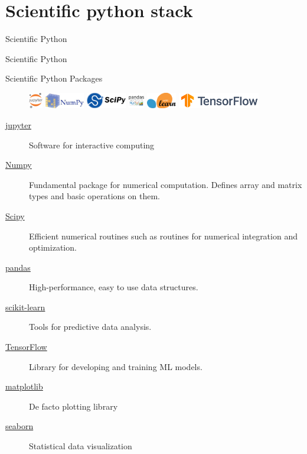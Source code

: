 \documentclass[aspectratio=169]{beamer}
\begin{document}
\section{Scientific python stack}

\begin{frame}{Scientific Python}
    \Huge{\centerline{Scientific Python}}
\end{frame} 

\begin{frame}{Scientific Python Packages}
\begin{figure}
    \centering
    \includegraphics[height=0.7cm]{figures/jupyter-logo.png}
    \includegraphics[height=0.7cm]{figures/numpy-logo.jpeg}
    \includegraphics[height=0.7cm]{figures/scipy-logo.png}
    \includegraphics[height=0.7cm]{figures/pandas-logo.png}
    \includegraphics[height=0.7cm]{figures/scikit-learn-logo.png}
    \includegraphics[height=0.7cm]{figures/tensorflow-logo.png}
\end{figure}
    \begin{description}
        \item[\href{http://jupyter.org/}{jupyter}] Software for interactive computing
        \item[\href{http://www.scipy.org/}{Numpy}] Fundamental package for numerical computation. Defines array and matrix types and basic operations on them.
        \item[\href{http://www.scipy.org/}{Scipy}] Efficient numerical routines such as routines for numerical integration and optimization.
        \item[\href{http://pandas.pydata.org/}{pandas}] High-performance, easy to use data structures.
        \item[\href{http://scikit-learn.org/}{scikit-learn}] Tools for predictive data analysis.
        \item[\href{http://www.tensorflow.org/}{TensorFlow}] Library for developing and training ML models.
        \item[\href{http://matplotlib.org/}{matplotlib}] De facto plotting library
        \item[\href{http://seaborn.pydata.org/}{seaborn}] Statistical data visualization
    \end{description}
\end{frame}
\end{document}
